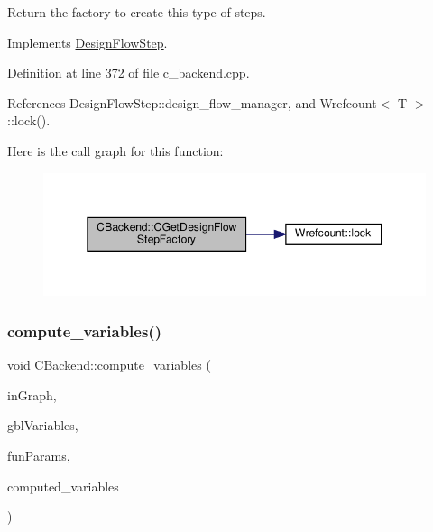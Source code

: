 Return the factory to create this type of steps. 



Implements \hyperlink{classDesignFlowStep_a5510a8d296670a07f6b53312c448994c}{Design\+Flow\+Step}.



Definition at line 372 of file c\+\_\+backend.\+cpp.



References Design\+Flow\+Step\+::design\+\_\+flow\+\_\+manager, and Wrefcount$<$ T $>$\+::lock().

Here is the call graph for this function\+:
\nopagebreak
\begin{figure}[H]
\begin{center}
\leavevmode
\includegraphics[width=345pt]{d3/de2/classCBackend_ae88e75e47f68079871cad2be17fde136_cgraph}
\end{center}
\end{figure}
\mbox{\label{classCBackend_abe204a588efad9a8205dc02097420473}} 
\subsubsection{\texorpdfstring{compute\+\_\+variables()}{compute\_variables()}}
{\footnotesize\ttfamily void C\+Backend\+::compute\+\_\+variables (\begin{DoxyParamCaption}\item[{const \hyperlink{op__graph_8hpp_a9a0b240622c47584bee6951a6f5de746}{Op\+Graph\+Const\+Ref}}]{in\+Graph,  }\item[{const \hyperlink{classCustomUnorderedSet}{Custom\+Unordered\+Set}$<$ unsigned int $>$ \&}]{gbl\+Variables,  }\item[{std\+::list$<$ unsigned int $>$ \&}]{fun\+Params,  }\item[{\hyperlink{classCustomUnorderedSet}{Custom\+Unordered\+Set}$<$ unsigned int $>$ \&}]{computed\+\_\+variables }\end{DoxyParamCaption})\hspace{0.3cm}{\ttfamily [protected]}}



